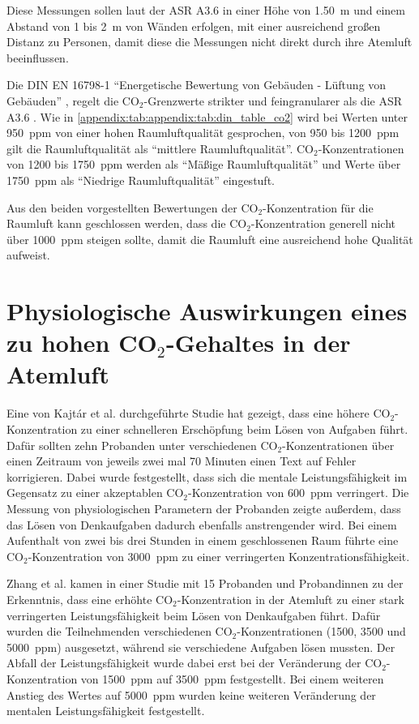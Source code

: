 \documentclass[a4paper,
    11pt,
    headings=small,
    ngerman,
    listof=totoc,
    numbers=noenddot]{scrreprt}[2021/11/13]
\begin{document}
Diese Messungen sollen laut der \ac{ASR} A3.6 \autocite{ASR} in einer Höhe von \SI{1.50}{\metre} und einem Abstand von \si{1} bis \SI{2}{\metre} von Wänden erfolgen, mit einer ausreichend großen Distanz zu Personen, damit diese die Messungen nicht direkt durch ihre Atemluft beeinflussen.

Die DIN EN 16798-1 \autocite{din_en_16798} \enquote{Energetische Bewertung von Gebäuden - Lüftung von Gebäuden} \autocite{din_en_16798}, regelt die CO$_2$-Grenzwerte strikter und feingranularer als die \ac{ASR} A3.6 \autocite{ASR}. Wie in \vref{appendix:tab:appendix:tab:din_table_co2} wird bei Werten unter \SI{950}{\ac{ppm}} von einer hohen Raumluftqualität gesprochen, von \si{950} bis \SI{1200}{\ac{ppm}} gilt die Raumluftqualität als \enquote{mittlere Raumluftqualität}. CO$_2$-Konzentrationen von \si{1200} bis \SI{1750}{\ac{ppm}} werden als \enquote{Mäßige Raumluftqualität} und Werte über \SI{1750}{\ac{ppm}} als \enquote{Niedrige Raumluftqualität} eingestuft.

Aus den beiden vorgestellten Bewertungen der CO$_2$-Konzentration für die Raumluft kann geschlossen werden, dass die CO$_2$-Konzentration generell nicht über \SI{1000}{\ac{ppm}} steigen sollte, damit die Raumluft eine ausreichend hohe Qualität aufweist.


\section{Physiologische Auswirkungen eines zu hohen CO\texorpdfstring{$_2$}{TEXT}-Gehaltes in der Atemluft}

Eine von Kajtár et al. \autocite{kajtar} durchgeführte Studie hat gezeigt, dass eine höhere CO$_2$-Konzentration zu einer schnelleren Erschöpfung beim Lösen von Aufgaben führt. Dafür sollten zehn Probanden unter verschiedenen CO$_2$-Konzentrationen über einen Zeitraum von jeweils zwei mal 70 Minuten einen Text auf Fehler korrigieren. Dabei wurde festgestellt, dass sich die mentale Leistungsfähigkeit im Gegensatz zu einer akzeptablen CO$_2$-Konzentration von \SI{600}{\ac{ppm}} verringert. Die Messung von physiologischen Parametern der Probanden zeigte außerdem, dass das Lösen von Denkaufgaben dadurch ebenfalls anstrengender wird. Bei einem Aufenthalt von zwei bis drei Stunden in einem geschlossenen Raum führte eine CO$_2$-Konzentration von \SI{3000}{\ac{ppm}} zu einer verringerten Konzentrationsfähigkeit.

Zhang et al. \autocite{zhang} kamen in einer Studie mit 15 Probanden und Probandinnen zu der Erkenntnis, dass eine erhöhte CO$_2$-Konzentration in der Atemluft zu einer stark verringerten Leistungsfähigkeit beim Lösen von Denkaufgaben führt. Dafür wurden die  Teilnehmenden verschiedenen CO$_2$-Konzentrationen (\si{1500}, \si{3500} und \SI{5000}{\ac{ppm}}) ausgesetzt, während sie verschiedene Aufgaben lösen mussten. Der Abfall der Leistungsfähigkeit wurde dabei erst bei der Veränderung der CO$_2$-Konzentration von \SI{1500}{\ac{ppm}} auf \SI{3500}{\ac{ppm}} festgestellt. Bei einem weiteren Anstieg des Wertes auf \SI{5000}{\ac{ppm}} wurden keine weiteren Veränderung der mentalen Leistungsfähigkeit festgestellt.
\end{document}

